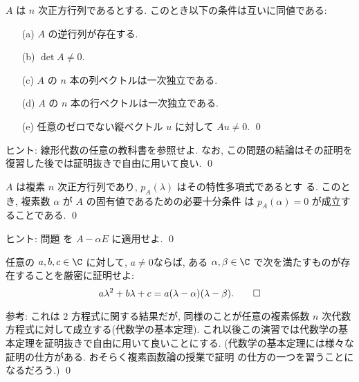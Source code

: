 \documentclass[12pt,twoside]{jarticle}
\begin{document}

\begin{question}[15点]\label{q:det-nxn}
  $A$ は $n$ 次正方行列であるとする. このとき以下の条件は互いに同値である:
  \begin{enumerate}
  \item[(a)] $A$ の逆行列が存在する.
  \item[(b)] $\det A \ne 0$.
  \item[(c)] $A$ の $n$ 本の列ベクトルは一次独立である.
  \item[(d)] $A$ の $n$ 本の行ベクトルは一次独立である.
  \item[(e)] 任意のゼロでない縦ベクトル $u$ に対して $Au\ne0$.
    \qed
  \end{enumerate}
\end{question}

\noindent 
ヒント: 線形代数の任意の教科書を参照せよ. なお, 
この問題の結論はその証明を復習した後では証明抜きで自由に用いて良い.
\qed


\begin{question}[5点]
  $A$ は複素 $n$ 次正方行列であり, $p_A(\lambda)$ はその特性多項式であるとす
  る.  このとき, 複素数 $\alpha$ が $A$ の固有値であるための必要十分条件
  は $p_A(\alpha)=0$ が成立することである. 
  \qed
\end{question}

\noindent 
ヒント: 問題  を $A - \alpha E$ に適用せよ.
\qed


\begin{question}[5点]
  任意の $a,b,c\in\C$ に対して, $a\ne0$ならば, 
  ある $\alpha,\beta\in\C$ で次を満たすものが存在することを厳密に証明せよ:
  \begin{equation*}
    a \lambda^2 + b \lambda + c 
    = a(\lambda - \alpha)(\lambda - \beta).
    \qed
  \end{equation*}
\end{question}

\noindent 
参考: これは $2$ 方程式に関する結果だが, 
同様のことが任意の複素係数 $n$ 次代数方程式に対して成立する(代数学の基本定理). 
これ以後この演習では代数学の基本定理を証明抜きで自由に用いて良いことにする. 
(代数学の基本定理には様々な証明の仕方がある. おそらく複素函数論の授業で証明
の仕方の一つを習うことになるだろう.)
\qed

\end{document}
